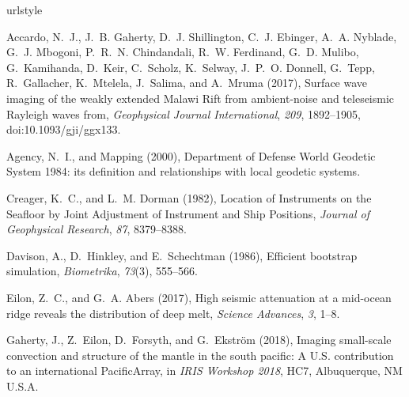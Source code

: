 \documentclass[10pt,titlepage]{article}
\begin{document}
\begin{thebibliography}{14}
\providecommand{\natexlab}[1]{#1}
\expandafter\ifx\csname urlstyle\endcsname\relax
  \providecommand{\doi}[1]{doi:\discretionary{}{}{}#1}\else
  \providecommand{\doi}{doi:\discretionary{}{}{}\begingroup
  \urlstyle{rm}\Url}\fi

Accardo, N.~J., J.~B. Gaherty, D.~J. Shillington, C.~J. Ebinger, A.~A. Nyblade,
  G.~J. Mbogoni, P.~R.~N. Chindandali, R.~W. Ferdinand, G.~D. Mulibo,
  G.~Kamihanda, D.~Keir, C.~Scholz, K.~Selway, J.~P.~O. Donnell, G.~Tepp,
  R.~Gallacher, K.~Mtelela, J.~Salima, and A.~Mruma (2017), {Surface wave
  imaging of the weakly extended Malawi Rift from ambient-noise and teleseismic
  Rayleigh waves from}, \textit{Geophysical Journal International},
  \textit{209}, 1892--1905, \doi{10.1093/gji/ggx133}.

Agency, N.~I., and Mapping (2000), {Department of Defense World Geodetic System
  1984: its definition and relationships with local geodetic systems}.

Creager, K.~C., and L.~M. Dorman (1982), {Location of Instruments on the
  Seafloor by Joint Adjustment of Instrument and Ship Positions},
  \textit{Journal of Geophysical Research}, \textit{87}, 8379--8388.

Davison, A., D.~Hinkley, and E.~Schechtman (1986), {Efficient bootstrap
  simulation}, \textit{Biometrika}, \textit{73}(3), 555--566.

Eilon, Z.~C., and G.~A. Abers (2017), {High seismic attenuation at a mid-ocean
  ridge reveals the distribution of deep melt}, \textit{Science Advances},
  \textit{3}, 1--8.

Gaherty, J., Z.~Eilon, D.~Forsyth, and G.~Ekstr{\"o}m (2018), Imaging
  small-scale convection and structure of the mantle in the south pacific: A
  {U}.{S}. contribution to an international {P}acific{A}rray, in \textit{IRIS
  Workshop 2018}, HC7, Albuquerque, NM U.S.A.


\end{thebibliography}
\end{document}
